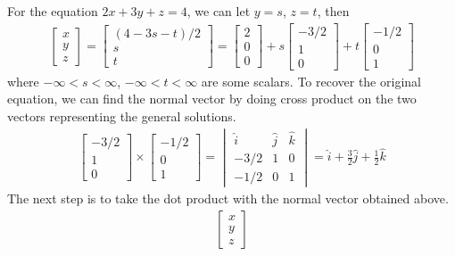 \begin{exmp}
For the equation $2x+3y+z = 4$, we can let $y=s$, $z=t$, then
\begin{align*}
\begin{bmatrix}
x \\
y \\
z
\end{bmatrix}
=
\begin{bmatrix}
(4-3s-t)/2 \\
s \\
t
\end{bmatrix}
=
\begin{bmatrix}
2 \\
0 \\
0
\end{bmatrix}
+ s
\begin{bmatrix}
-3/2 \\
1 \\
0
\end{bmatrix}
+ t
\begin{bmatrix}
-1/2 \\
0 \\
1
\end{bmatrix}
\end{align*}
where $-\infty < s < \infty$, $-\infty < t < \infty$ are some scalars. To recover the original equation, we can find the normal vector by doing cross product on the two vectors representing the general solutions.
\begin{align*}
\begin{bmatrix}
-3/2 \\
1 \\
0
\end{bmatrix}
\times
\begin{bmatrix}
-1/2 \\
0 \\
1
\end{bmatrix}
=
\begin{vmatrix}
\hat{i} & \hat{j} & \hat{k} \\
-3/2 & 1 & 0 \\
-1/2 & 0 & 1
\end{vmatrix}
= \hat{i} + \frac{3}{2}\hat{j} + \frac{1}{2}\hat{k}
\end{align*}
The next step is to take the dot product with the normal vector obtained above.
\begin{align*}
\begin{bmatrix}
x \\
y \\
z
\end{bmatrix}

\end{align*}
\end{exmp}
